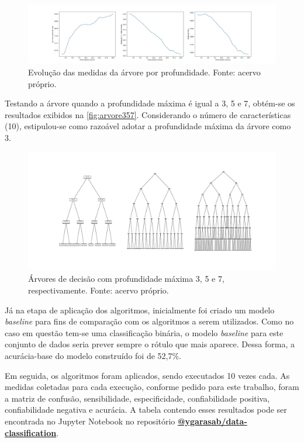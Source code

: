 \documentclass[12pt]{article}
\begin{document}
\begin{figure}[t!]
    \includegraphics[width=\linewidth]{figures/acuracia_por_profundidade}
    \caption{Evolução das medidas da árvore por profundidade. Fonte: acervo próprio.}
    \label{fig:acuracia_profundidade}
\end{figure}

Testando a árvore quando a profundidade máxima é igual a 3, 5 e 7, obtém-se os resultados exibidos na \autoref{fig:arvore357}. Considerando o número de características (10), estipulou-se como razoável adotar a profundidade máxima da árvore como 3.

\begin{figure}[t!]
    \includegraphics[width=\linewidth]{figures/arvore_357}
    \caption{Árvores de decisão com profundidade máxima 3, 5 e 7, respectivamente. Fonte: acervo próprio.}
    \label{fig:arvore357}
\end{figure}

Já na etapa de aplicação dos algoritmos, inicialmente foi criado um modelo \textit{baseline} para fins de comparação com os algoritmos a serem utilizados. Como no caso em questão tem-se uma classificação binária, o modelo \textit{baseline} para este conjunto de dados seria prever sempre o rótulo que mais aparece. Dessa forma, a acurácia-base do modelo construído foi de 52,7\%.

Em seguida, os algoritmos foram aplicados, sendo executados 10 vezes cada. As medidas coletadas para cada execução, conforme pedido para este trabalho, foram a matriz de confusão, sensibilidade, especificidade, confiabilidade positiva, confiabilidade negativa e acurácia. A tabela contendo esses resultados pode ser encontrada no Jupyter Notebook no repositório \textbf{\href{https://github.com/ygarasab/data-classification}{@ygarasab/data-classification}}.
\end{document}
